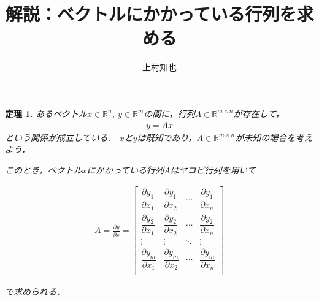 \documentclass[a4j,10pt]{jsarticle}
\theoremstyle{plain}
\newtheorem*{thm*}{定理}
\begin{document}
\title{解説：ベクトルにかかっている行列を求める}
\author{上村知也}
\setlength{\baselineskip}{3.8mm}	%
\maketitle


\begin{thm*}
    あるベクトル$x \in \mathbb{R}^n$, $y \in \mathbb{R}^m$の間に，行列$A \in \mathbb{R}^{m \times n}$が存在して，
    \begin{align}
        y=Ax
    \end{align}
    という関係が成立している．
    $x$と$y$は既知であり，$A\in \mathbb{R}^{m\times n}$が未知の場合を考えよう．

    このとき，ベクトル$x$にかかっている行列$A$はヤコビ行列を用いて

    \begin{align}
        A = \frac{\partial y}{\partial x}
        =\begin{bmatrix}
        \dfrac{\partial y_1}{\partial x_1} & \dfrac{\partial y_1}{\partial x_2} & \cdots & \dfrac{\partial y_1}{\partial x_n}\\
        \dfrac{\partial y_2}{\partial x_1} & \dfrac{\partial y_2}{\partial x_2} & \cdots & \dfrac{\partial y_2}{\partial x_n}\\
        \vdots & \vdots & \ddots & \vdots\\
        \dfrac{\partial y_m}{\partial x_1} & \dfrac{\partial y_m}{\partial x_2} & \cdots & \dfrac{\partial y_m}{\partial x_n}\\
        \end{bmatrix}
    \end{align}

    で求められる．
\end{thm*}
\end{document}
